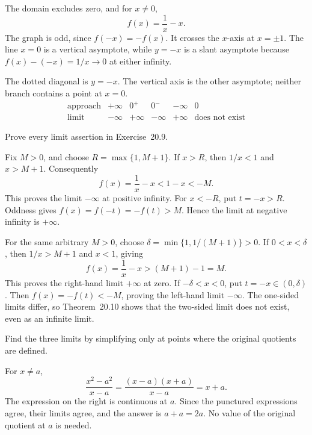 The domain excludes zero, and for $x\ne0$,
\[
 f(x)=\frac1x-x.
\]
The graph is odd, since $f(-x)=-f(x)$. It crosses the $x$-axis
at $x=\pm1$. The line $x=0$ is a vertical asymptote, while
$y=-x$ is a slant asymptote because $f(x)-(-x)=1/x\to0$
at either infinity.
\begin{center}\rossSketchReciprocalMinusX\end{center}
The dotted diagonal is $y=-x$. The vertical axis is the other
asymptote; neither branch contains a point at $x=0$.
\[
\begin{array}{c|ccccc}
 \text{approach}&+\infty&0^+&0^-&-\infty&0\\ \hline
 \text{limit}&-\infty&+\infty&-\infty&+\infty&\text{does not exist}
\end{array}
\]

\goal Prove every limit assertion in Exercise~20.9.

Fix $M>0$, and choose $R=\max\{1,M+1\}$.
If $x>R$, then $1/x<1$ and $x>M+1$. Consequently
\[
 f(x)=\frac1x-x<1-x<-M.
\]
This proves the limit $-\infty$ at positive infinity.
For $x<-R$, put $t=-x>R$. Oddness gives
$f(x)=f(-t)=-f(t)>M$. Hence the limit at negative infinity
is $+\infty$.

For the same arbitrary $M>0$, choose
$\delta=\min\{1,1/(M+1)\}>0$.
If $0<x<\delta$, then $1/x>M+1$ and $x<1$, giving
\[
 f(x)=\frac1x-x>(M+1)-1=M.
\]
This proves the right-hand limit $+\infty$ at zero.
If $-\delta<x<0$, put $t=-x\in(0,\delta)$. Then
$f(x)=-f(t)<-M$, proving the left-hand limit $-\infty$.
The one-sided limits differ, so Theorem~20.10 shows that the
two-sided limit does not exist, even as an infinite limit.

\goal Find the three limits by simplifying only at points where
the original quotients are defined.

For $x\ne a$,
\[
 \frac{x^2-a^2}{x-a}
 =\frac{(x-a)(x+a)}{x-a}=x+a.
\]
The expression on the right is continuous at $a$. Since the
punctured expressions agree, their limits agree, and the answer
is $a+a=2a$. No value of the original quotient at $a$ is needed.

